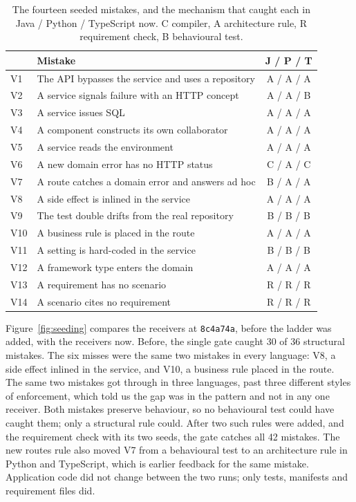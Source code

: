 \begin{table}[t]
  \centering\small
  \caption{The fourteen seeded mistakes, and the mechanism that caught each in Java / Python /
  TypeScript now. C compiler, A architecture rule, R requirement check, B behavioural test.}
  \label{tab:violations}
  \begin{tabularx}{\linewidth}{l|X|c}
    \hline
    & \textbf{Mistake} & \textbf{J / P / T} \\
    \hline\hline
    V1 & The API bypasses the service and uses a repository & A / A / A \\
    \hline
    V2 & A service signals failure with an HTTP concept & A / A / B \\
    \hline
    V3 & A service issues SQL & A / A / A \\
    \hline
    V4 & A component constructs its own collaborator & A / A / A \\
    \hline
    V5 & A service reads the environment & A / A / A \\
    \hline
    V6 & A new domain error has no HTTP status & C / A / C \\
    \hline
    V7 & A route catches a domain error and answers ad hoc & B / A / A \\
    \hline
    V8 & A side effect is inlined in the service & A / A / A \\
    \hline
    V9 & The test double drifts from the real repository & B / B / B \\
    \hline
    V10 & A business rule is placed in the route & A / A / A \\
    \hline
    V11 & A setting is hard-coded in the service & B / B / B \\
    \hline
    V12 & A framework type enters the domain & A / A / A \\
    \hline
    V13 & A requirement has no scenario & R / R / R \\
    \hline
    V14 & A scenario cites no requirement & R / R / R \\
    \hline
  \end{tabularx}
\end{table}

Figure~\ref{fig:seeding} compares the receivers at \texttt{8c4a74a}, before the ladder was
added, with the receivers now. Before, the single gate caught 30 of 36 structural
mistakes. The six misses were the same two mistakes in every language: V8, a side effect inlined
in the service, and V10, a business rule placed in the route. The same two mistakes got through
in three languages, past three different styles of enforcement, which told us the gap was in the
pattern and not in any one receiver. Both mistakes preserve behaviour, so no behavioural test could have caught
them; only a structural rule could. After two such rules were added, and the requirement check
with its two seeds, the gate catches all 42 mistakes. The new routes rule also moved V7 from a
behavioural test to an architecture rule in Python and TypeScript, which is earlier feedback for
the same mistake. Application code did not change between the two runs; only tests, manifests
and requirement files did.


